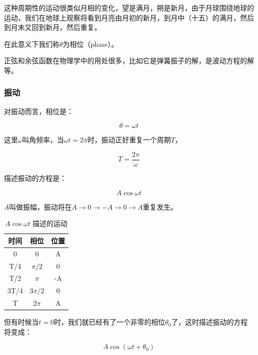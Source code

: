 这种周期性的运动很类似月相的变化，望是满月，朔是新月，由于月球围绕地球的运动，我们在地球上观察将看到月亮由月初的新月，到月中（十五）的满月，然后到月末又回到新月，然后重复。

在此意义下我们称$\theta$为相位（phase）。

正弦和余弦函数在物理学中的用处很多，比如它是弹簧振子的解，是波动方程的解等。

\subsubsection{振动}

对振动而言，相位是：

\begin{equation}
\theta = \omega t 
\end{equation}

这里$\omega$叫角频率，当$\omega t = 2 \pi$时，振动正好重复一个周期$T$，

\begin{equation}
T = \frac{2 \pi}{\omega}
\end{equation}

描述振动的方程是：

\begin{equation}
A \cos \omega t
\end{equation}

$A$叫做振幅，振动将在$A \to 0 \to -A \to 0 \to A$重复发生。

\begin{table}[htdp]
\caption{$A \cos \omega t$ 描述的运动}
\begin{center}
\begin{tabular}{|c|c|c|}
\hline
时间 & 相位 &  位置 \\
\hline
0 & 0 & A \\
T/4 & $\pi /2 $ & 0 \\
T/2 & $\pi$ & -A \\
3T/4 & $3 \pi /2  $ &  0 \\
T &  $2\pi$  & A \\
\hline
\end{tabular}
\end{center}
\end{table}%

但有时候当$t = 0$时，我们就已经有了一个非零的相位$\theta_0$了，这时描述振动的方程将变成：

\begin{equation}
A \cos (\omega t + \theta_0)
\end{equation}

